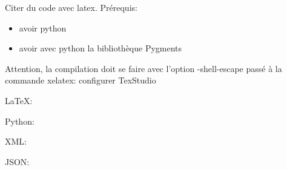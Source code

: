\documentclass[12pt]{book}
\begin{document}
	Citer du code avec latex. Prérequis:
	\begin{itemize}
		\item avoir python 
		\item avoir avec python la bibliothèque Pygments %
	\end{itemize}
	
	Attention, la compilation doit se faire avec l'option -shell-escape passé à la commande xelatex:  configurer  TexStudio
	
	
	
	\LaTeX: 
	
	
	Python:
	
	
	XML:
	
	
	JSON:
	
	
	
\end{document}
